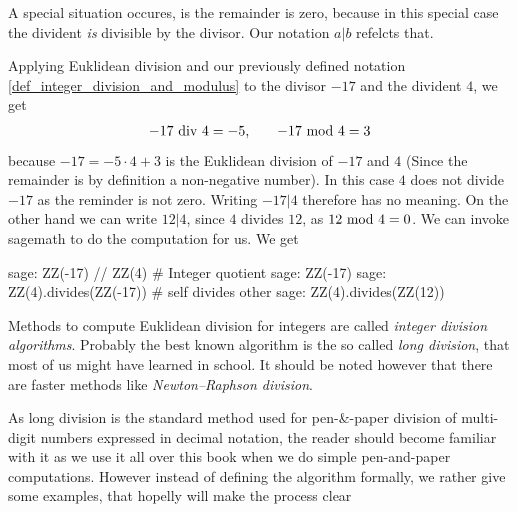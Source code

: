 A special situation occures, is the remainder is zero, because in this special case the divident \textit{is} divisible by the divisor. Our notation $a|b$ refelcts that. 


\begin{example} Applying Euklidean division and our previously defined notation \ref{def_integer_division_and_modulus} to the divisor $-17$ and the divident $4$, we get 
\begin{equation*}
\begin{array}{lcr}
-17 \text{ div } 4 = - 5, & & -17 \text{ mod } 4 = 3
\end{array}
\end{equation*}
because $ -17 = -5 \cdot 4 + 3 $  is the Euklidean division of $-17$ and $4$ (Since the remainder is by definition a non-negative number). In this case $4$ does not divide $-17$ as the reminder is not zero. Writing $-17 | 4$ therefore has no meaning. On the other hand we can write $12 | 4$, since $4$ divides $12$, as $ 12 \text{ mod } 4 = 0 $. We can invoke sagemath to do the computation for us. We get
\begin{sagecommandline}
sage: ZZ(-17) // ZZ(4) # Integer quotient 
sage: ZZ(-17) %
sage: ZZ(4).divides(ZZ(-17)) # self divides other
sage: ZZ(4).divides(ZZ(12))
\end{sagecommandline}
\end{example}
Methods to compute Euklidean division for integers are called \textit{integer division algorithms}. Probably the best known algorithm is the so called \textit{long division}, that most of us might have learned in school. It should be noted however that there are faster methods like \textit{Newton–Raphson division}.

As long division is the standard method used for pen-\&-paper division of multi-digit numbers expressed in decimal notation, the reader should become familiar with it as we use it all over this book when we do simple pen-and-paper computations. However instead of defining the algorithm formally, we rather give some examples, that hopelly will make the process clear

